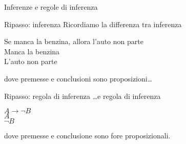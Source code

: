 \documentclass[aspectratio=169,10pt,dvipsnames,xcolor=table,handout]{beamer}
\begin{document}
\begin{frame}{Inferenze e regole di inferenza}
    \begin{block}{Ripasso: inferenza}
        Ricordiamo la differenza tra inferenza
        \begin{center}
                \begin{inference}
                    Se manca la benzina, allora l'auto non parte\\
                    Manca la benzina\\
                    \hline
                    L'auto non parte
                \end{inference}
        \end{center}
        dove premesse e conclusioni sono proposizioni\ldots
    \end{block}

    \pause
    \begin{block}{Ripasso: regola di inferenza}
        \ldots e regola di inferenza
        \begin{center}
            \begin{inference}
                $A \to \neg B$\\
                $A$\\
                \hline
                $\neg B$
            \end{inference}
        \end{center}
        dove premesse e conclusione sono fore proposizionali.
    \end{block}
\end{frame}
\end{document}
